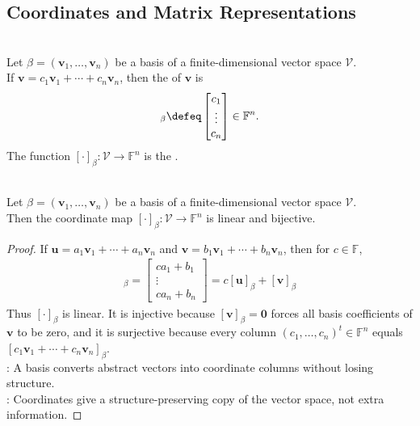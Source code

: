 \subsection{Coordinates and Matrix Representations}
\begin{definition} \\
Let $\beta=(\mathbf{v}_1,\ldots,\mathbf{v}_n)$ be a basis of a finite-dimensional vector space $\mathcal{V}$.\\
If $\mathbf{v}=c_1\mathbf{v}_1+\cdots+c_n\mathbf{v}_n$, then the  of $\mathbf{v}$ is
\begin{align}
[\mathbf{v}]_{\beta}\defeq
\begin{bmatrix}
c_1\\
\vdots\\
c_n
\end{bmatrix}
\in\mathbb{F}^n. \nonumber
\end{align}
The function $[\cdot]_{\beta}:\mathcal{V}\to\mathbb{F}^n$ is the .
\end{definition}

\begin{proposition} \label{prop:coordinate-map-isomorphism} \\
Let $\beta=(\mathbf{v}_1,\ldots,\mathbf{v}_n)$ be a basis of a finite-dimensional vector space $\mathcal{V}$.\\
Then the coordinate map $[\cdot]_{\beta}:\mathcal{V}\to\mathbb{F}^n$ is linear and bijective.
\begin{proof}
If $\mathbf{u}=a_1\mathbf{v}_1+\cdots+a_n\mathbf{v}_n$ and $\mathbf{v}=b_1\mathbf{v}_1+\cdots+b_n\mathbf{v}_n$, then for $c\in\mathbb{F}$,
\begin{align}
[c\mathbf{u}+\mathbf{v}]_{\beta} =
\begin{bmatrix}
ca_1+b_1\\
\vdots\\
ca_n+b_n
\end{bmatrix}
= c[\mathbf{u}]_{\beta}+[\mathbf{v}]_{\beta} \nonumber
\end{align}
Thus $[\cdot]_{\beta}$ is linear. It is injective because $[\mathbf{v}]_{\beta}=\mathbf{0}$ forces all basis coefficients of $\mathbf{v}$ to be zero, and it is surjective because every column $(c_1,\ldots,c_n)^t\in\mathbb{F}^n$ equals $[c_1\mathbf{v}_1+\cdots+c_n\mathbf{v}_n]_{\beta}$.\\
: A basis converts abstract vectors into coordinate columns without losing structure.\\
: Coordinates give a structure-preserving copy of the vector space, not extra information.
\end{proof}
\end{proposition}

